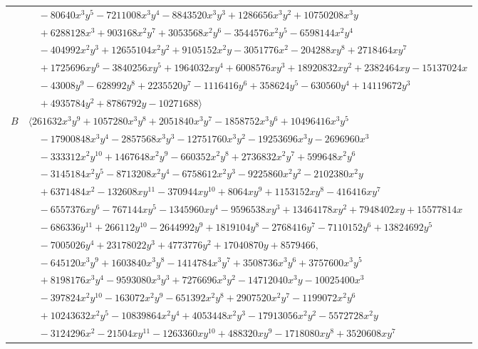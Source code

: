 \documentclass[11pt]{article}
\begin{document}
\begin{longtable}{@{}ll@{}}
 & $\quad -80640x^{3}y^{5}-7211008x^{3}y^{4}-8843520x^{3}y^{3}+1286656x^{3}y^{2}+10750208x^{3}y$\\
 & $\quad +6288128x^{3}+903168x^{2}y^{7}+3053568x^{2}y^{6}-3544576x^{2}y^{5}-6598144x^{2}y^{4}$\\
 & $\quad -404992x^{2}y^{3}+12655104x^{2}y^{2}+9105152x^{2}y-3051776x^{2}-204288xy^{8}+2718464xy^{7}$\\
 & $\quad +1725696xy^{6}-3840256xy^{5}+1964032xy^{4}+6008576xy^{3}+18920832xy^{2}+2382464xy-15137024x$\\
 & $\quad -43008y^{9}-628992y^{8}+2235520y^{7}-1116416y^{6}+358624y^{5}-630560y^{4}+14119672y^{3}$\\
 & $\quad +4935784y^{2}+8786792y-10271688\rangle$\\
$B$ & $\langle 261632x^{3}y^{9}+1057280x^{3}y^{8}+2051840x^{3}y^{7}-1858752x^{3}y^{6}+10496416x^{3}y^{5}$\\
 & $\quad -17900848x^{3}y^{4}-2857568x^{3}y^{3}-12751760x^{3}y^{2}-19253696x^{3}y-2696960x^{3}$\\
 & $\quad -333312x^{2}y^{10}+1467648x^{2}y^{9}-660352x^{2}y^{8}+2736832x^{2}y^{7}+599648x^{2}y^{6}$\\
 & $\quad -3145184x^{2}y^{5}-8713208x^{2}y^{4}-6758612x^{2}y^{3}-9225860x^{2}y^{2}-2102380x^{2}y$\\
 & $\quad +6371484x^{2}-132608xy^{11}-370944xy^{10}+8064xy^{9}+1153152xy^{8}-416416xy^{7}$\\
 & $\quad -6557376xy^{6}-767144xy^{5}-1345960xy^{4}-9596538xy^{3}+13464178xy^{2}+7948402xy+15577814x$\\
 & $\quad -686336y^{11}+266112y^{10}-2644992y^{9}+1819104y^{8}-2768416y^{7}-7110152y^{6}+13824692y^{5}$\\
 & $\quad -7005026y^{4}+23178022y^{3}+4773776y^{2}+17040870y+8579466,$\\
 & $\quad -645120x^{3}y^{9}+1603840x^{3}y^{8}-1414784x^{3}y^{7}+3508736x^{3}y^{6}+3757600x^{3}y^{5}$\\
 & $\quad +8198176x^{3}y^{4}-9593080x^{3}y^{3}+7276696x^{3}y^{2}-14712040x^{3}y-10025400x^{3}$\\
 & $\quad -397824x^{2}y^{10}-163072x^{2}y^{9}-651392x^{2}y^{8}+2907520x^{2}y^{7}-1199072x^{2}y^{6}$\\
 & $\quad +10243632x^{2}y^{5}-10839864x^{2}y^{4}+4053448x^{2}y^{3}-17913056x^{2}y^{2}-5572728x^{2}y$\\
 & $\quad -3124296x^{2}-21504xy^{11}-1263360xy^{10}+488320xy^{9}-1718080xy^{8}+3520608xy^{7}$\\

\end{longtable}
\end{document}
